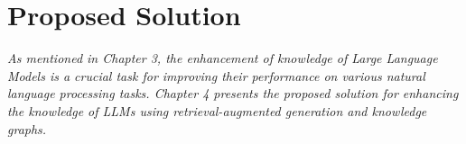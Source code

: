 \chapter{Proposed Solution}

\textit{As mentioned in Chapter 3, the enhancement of knowledge of Large Language Models is a crucial task for improving their performance on various natural language processing tasks. Chapter 4 presents the proposed solution for enhancing the knowledge of LLMs using retrieval-augmented generation and knowledge graphs.}






% 

